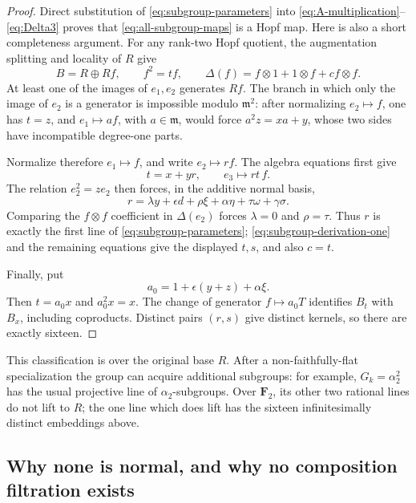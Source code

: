 \documentclass[11pt]{article}
\theoremstyle{remark}
\newcommand{\F}{\mathbf F}
\newcommand{\m}{\mathfrak m}
\begin{document}
\begin{proof}
Direct substitution of \eqref{eq:subgroup-parameters} into
\eqref{eq:A-multiplication}--\eqref{eq:Delta3} proves that
\eqref{eq:all-subgroup-maps} is a Hopf map.  Here is also a short
completeness argument.  For any rank-two Hopf quotient, the augmentation
splitting and locality of \(R\) give
\[
 B=R\oplus Rf,\qquad f^2=tf,\qquad
 \Delta(f)=f\otimes1+1\otimes f+c f\otimes f.
\]
At least one of the images of \(e_1,e_2\) generates \(Rf\).  The branch in
which only the image of \(e_2\) is a generator is impossible modulo
\(\m^2\): after normalizing \(e_2\mapsto f\), one has \(t=z\), and
\(e_1\mapsto af\), with \(a\in\m\), would force
\(a^2z=xa+y\), whose two sides have incompatible degree-one parts.

Normalize therefore \(e_1\mapsto f\), and write \(e_2\mapsto rf\).  The
algebra equations first give
\begin{equation}\label{eq:subgroup-derivation-one}
 t=x+yr,\qquad e_3\mapsto rt\,f.
\end{equation}
The relation \(e_2^2=ze_2\) then forces, in the additive normal basis,
\[
 r=\lambda y+\epsilon d+\rho\xi+\alpha\eta
       +\tau\omega+\gamma\sigma.
\]
Comparing the \(f\otimes f\) coefficient in \(\Delta(e_2)\) forces
\(\lambda=0\) and \(\rho=\tau\).  Thus \(r\) is exactly the first line of
\eqref{eq:subgroup-parameters}; \eqref{eq:subgroup-derivation-one} and the
remaining equations give the displayed \(t,s\), and also \(c=t\).

Finally, put
\[
 a_0=1+\epsilon(y+z)+\alpha\xi.
\]
Then \(t=a_0x\) and \(a_0^2x=x\).  The change of generator
\(f\mapsto a_0T\) identifies \(B_t\) with \(B_x\), including coproducts.
Distinct pairs \((r,s)\) give distinct kernels, so there are exactly
sixteen.
\end{proof}

This classification is over the original base \(R\).  After a
non-faithfully-flat specialization the group can acquire additional
subgroups: for example, \(G_k=\alpha_2^2\) has the usual projective line of
\(\alpha_2\)-subgroups.  Over \(\F_2\), its other two rational lines do not
lift to \(R\); the one line which does lift has the sixteen infinitesimally
distinct embeddings above.

\subsection{Why none is normal, and why no composition filtration exists}
\end{document}

